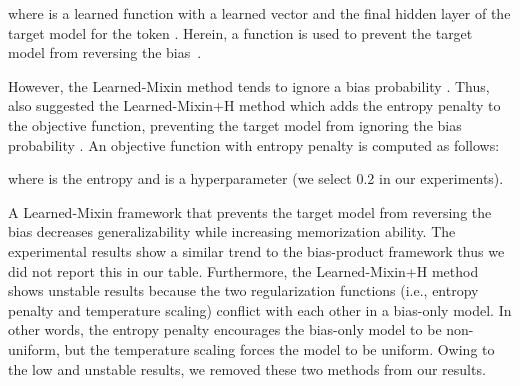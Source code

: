 \documentclass[11pt]{article}
\begin{document}
where  is a learned function with a learned vector  and the final hidden layer  of the target model for the token . 
Herein, a  function is used to prevent the target model from reversing the bias~\cite{clark2019don}.

However, the Learned-Mixin method tends to ignore a bias probability .
Thus, \cite{clark2019don} also suggested the Learned-Mixin+H method which adds the entropy penalty to the objective function, preventing the target model from ignoring the bias probability .
An objective function with entropy penalty is computed as follows:




where  is the entropy and  is a hyperparameter (we select 0.2 in our experiments). 

A Learned-Mixin framework that prevents the target model from reversing the bias decreases generalizability while increasing memorization ability.
The experimental results show a similar trend to the bias-product framework thus we did not report this in our table.
Furthermore, the Learned-Mixin+H method shows unstable results because the two regularization functions (i.e., entropy penalty and temperature scaling) conflict with each other in a bias-only model.
In other words, the entropy penalty encourages the bias-only model to be non-uniform, but the temperature scaling forces the model to be uniform.
Owing to the low and unstable results, we removed these two methods from our results.
\end{document}
